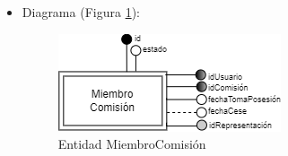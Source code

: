 \begin{itemize}
\begin{itemize}
        \item fechaTomaPosesión
        \begin{itemize}
            \item Definición: fecha de toma de posesión del miembro de gobierno.
            \item Dominio: 01/01/1970 hasta 31/12/9999.
            \item Tipo: atributo simple.
            \item Opcional: no
            \item Ejemplo: 10/09/2023
        \end{itemize}

        \item fechaCese
        \begin{itemize}
            \item Definición: fecha de cese del miembro de gobierno.
            \item Dominio: 01/01/1970 hasta 31/12/9999.
            \item Tipo: atributo simple.
            \item Opcional: sí
            \item Ejemplo: 10/09/2023
        \end{itemize}

        \item estado
        \begin{itemize}
            \item Definición: estado del miembro de la comisión.
            \item Dominio: 1 (Habilitado), 0 (Deshabilitado).
            \item Tipo: atributo simple.
            \item Opcional: no
            \item Ejemplo: 1
        \end{itemize}
    \end{itemize}

    \item Diagrama (Figura \ref{fig:E-MiembroComisión}):

    \begin{figure}[H]
        \centering
        \includegraphics[scale=0.8]{img/diagramas/EER/E-MiembroComisión.png}
        \caption{Entidad MiembroComisión}
        \label{fig:E-MiembroComisión}
    \end{figure}


\end{itemize}
